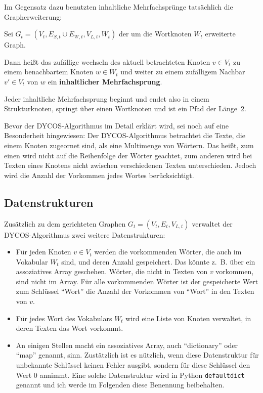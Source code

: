 Im Gegensatz dazu benutzten inhaltliche Mehrfachsprünge
tatsächlich die Grapherweiterung:

\begin{definition}
    Sei $G_t = (V_t, E_{S,t} \cup E_{W,t}, V_{L,t}, W_{t})$ der
    um die Wortknoten $W_{t}$ erweiterte Graph.

    Dann heißt das zufällige wechseln des aktuell betrachteten
    Knoten $v \in V_t$ zu einem benachbartem Knoten $w \in W_t$
    und weiter zu einem zufälligem Nachbar $v' \in V_t$ von $w$
    ein \textbf{inhaltlicher Mehrfachsprung}.
\end{definition}

Jeder inhaltliche Mehrfachsprung beginnt und endet also in einem Strukturknoten,
springt über einen Wortknoten und ist ein Pfad der Länge~2.

Bevor der DYCOS-Algorithmus im Detail erklärt wird, sei noch auf eine
Besonderheit hingewiesen:
Der DYCOS-Algorithmus betrachtet die Texte, die einem Knoten 
zugeornet sind, als eine Multimenge von Wörtern. Das heißt, zum einen 
wird nicht auf die Reihenfolge der Wörter geachtet, zum anderen wird 
bei Texten eines Knotens nicht zwischen verschiedenen 
Texten unterschieden. Jedoch wird die Anzahl der Vorkommen 
jedes Wortes berücksichtigt.

\subsection{Datenstrukturen}
Zusätzlich zu dem gerichteten Graphen $G_t = (V_t, E_t, V_{L,t})$ 
verwaltet der DYCOS-Algorithmus zwei weitere Datenstrukturen:
\begin{itemize}
    \item Für jeden Knoten $v \in V_t$ werden die vorkommenden Wörter,
          die auch im Vokabular $W_t$ sind,
          und deren Anzahl gespeichert. Das könnte z.~B. über ein 
          assoziatives Array geschehen. Wörter, die nicht in 
          Texten von $v$ vorkommen, sind nicht im Array. Für
          alle vorkommenden Wörter ist der gespeicherte Wert zum 
          Schlüssel \enquote{Wort} die Anzahl der Vorkommen von 
          \enquote{Wort} in den Texten von $v$.
    \item Für jedes Wort des Vokabulars $W_t$ wird eine Liste von 
          Knoten verwaltet, in deren Texten das Wort vorkommt.
    \item An einigen Stellen macht ein assoziatives Array, auch 
          \enquote{dictionary} oder \enquote{map} genannt, sinn.
          Zustätzlich ist es nützlich, wenn diese Datenstruktur für 
          unbekannte Schlüssel keinen Fehler ausgibt, sondern für diese
          Schlüssel den Wert 0 annimmt. Eine solche Datenstruktur
          wird in Python \texttt{defaultdict} genannt und ich werde
          im Folgenden diese Benennung beibehalten.
\end{itemize}

